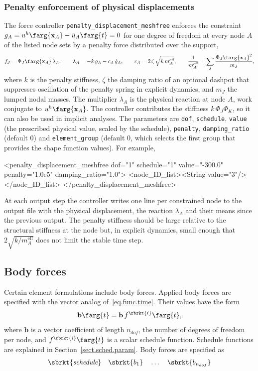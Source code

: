 \subsubsection{Penalty enforcement of physical displacements}
The force controller \texttt{penalty\_displacement\_meshfree} enforces the constraint
$g_{A} = u^{h}\farg{\mathbf{x}_{A}} - \bar{u}_{A}\farg{t} = 0$ for one degree of freedom at every
node $A$ of the listed node sets by a penalty force distributed over the support,
\begin{equation}
f_{J} = \Phi_{J}\farg{\mathbf{x}_{A}}\,\lambda_{A}, \qquad
\lambda_{A} = -k\,g_{A} - c_{A}\,\dot{g}_{A}, \qquad
c_{A} = 2\,\zeta\,\sqrt{k\,m^{\textrm{eff}}_{A}}, \qquad
\frac{1}{m^{\textrm{eff}}_{A}} = \sum_{J}\frac{\Phi_{J}\farg{\mathbf{x}_{A}}^{2}}{m_{J}},
\end{equation}
where $k$ is the penalty stiffness, $\zeta$ the damping ratio of an optional dashpot that
suppresses oscillation of the penalty spring in explicit dynamics, and $m_{J}$ the lumped nodal
masses. The multiplier $\lambda_{A}$ is the physical reaction at node $A$, work conjugate to
$u^{h}\farg{\mathbf{x}_{A}}$. The controller contributes the stiffness
$k\,\Phi_{J}\Phi_{K}$, so it can also be used in implicit analyses. The parameters are
\texttt{dof}, \texttt{schedule}, \texttt{value} (the prescribed physical value, scaled by the
schedule), \texttt{penalty}, \texttt{damping\_ratio} (default 0) and \texttt{element\_group} (default 0,
which selects the first group that provides the shape function values). For example,
\begin{inputfile}
<penalty_displacement_meshfree dof="1" schedule="1"
    value="-300.0" penalty="1.0e5" damping_ratio="1.0">
  <node_ID_list><String value="3"/></node_ID_list>
</penalty_displacement_meshfree>
\end{inputfile}
At each output step the controller writes one line per constrained node to the output file with
the physical displacement, the reaction $\lambda_{A}$ and their means since the previous output.
The penalty stiffness should be large relative to the structural stiffness at the node but, in
explicit dynamics, small enough that $2\sqrt{k/m^{\textrm{eff}}_{A}}$ does not limit the stable
time step.


\subsection{Body forces}
\label{set.ICandBC.body}
Certain element formulations include body forces.
Applied body forces are specified with the vector analog 
of~\eqref{eq.func.time}.
Their values have the form
\begin{equation}
\label{eq.vec.func.time}
    \mathbf{b}\farg{t} = \mathbf{b}\,f^{\rbrkt{i}}\farg{t},
\end{equation}
where $\mathbf{b}$ is a vector coefficient of length $n_{dof}$, the 
number of degrees of freedom per node, and $f^{\rbrkt{i}}\farg{t}$ 
is a scalar schedule function. Schedule functions are explained in 
Section~\ref{sect.sched.param}.
Body forces are specified as
\[  
\sbrkt{\textit{schedule}} \quad 
\sbrkt{b_{1}} \quad \ldots \quad
\sbrkt{b_{n_{dof}}}
\]

